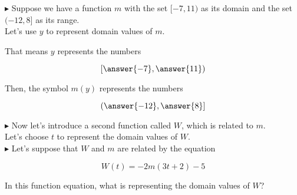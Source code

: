 \documentclass{ximera}
\begin{document}
\begin{example}




\textbf{\textcolor{blue!55!black}{$\blacktriangleright$}}  Suppose we have a function $m$ with the set $[-7, 11)$ as its domain and the set $(-12, 8]$ as its range. \\

Let's use $y$ to represent domain values of $m$.  



\begin{question}

That means $y$ represents the numbers 

\[
\left[ \answer{-7}, \answer{11} \right)
\]

\end{question}





\begin{question}

Then, the symbol $m(y)$ represents the numbers

\[
\left( \answer{-12}, \answer{8} \right]
\]

\end{question}




\textbf{\textcolor{blue!55!black}{$\blacktriangleright$}} Now let's introduce a second function called $W$, which is related to $m$. \\

Let's choose $t$ to represent the domain values of $W$. \\


\textbf{\textcolor{blue!55!black}{$\blacktriangleright$}} Let's suppose that $W$ and $m$ are related by the equation 

\[ 
W(t) = -2 m(3t + 2) - 5
\]





\begin{question}

In this function equation, what is representing the domain values of $W$?

\begin{multipleChoice}
\end{multipleChoice}

\end{question}





\end{example}
\end{document}
